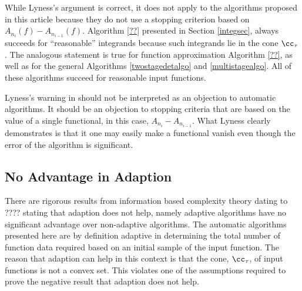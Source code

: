 \documentclass[]{elsarticle}
\theoremstyle{definition}
\theoremstyle{remark}
\begin{document}
While Lyness's argument is correct, it does not apply to the algorithms proposed in this article because they do not use a stopping criterion based on  $A_{n_{i}}(f)-A_{n_{i-1}}(f)$.  Algorithm \ref{??} presented in Section \ref{integsec}, always succeeds for ``reasonable'' integrands because such integrands lie in the cone $\cc_{\tau}$.  The analogous statement is true for function approximation Algorithm \ref{??}, as well as for the general Algorithms \ref{twostagedetalgo} and \ref{multistagealgo}.  All of these algorithms succeed for reasonable input functions.  

Lyness's warning in \cite{Lyn83} should not be interpreted as an objection to automatic algorithms.  It should be an objection to stopping criteria that are based on the value of a single functional, in this case, $A_{n_{i}}-A_{n_{i-1}}$.  What Lyness clearly demonstrates is that it one may easily make a functional vanish even though the error of the algorithm is significant.

\subsection{No Advantage in Adaption}

There are rigorous results from information based complexity theory dating to ???? stating that adaption does not help, namely adaptive algorithms have no significant advantage over non-adaptive algorithms. The automatic algorithms presented here are by definition adaptive in determining the total number of function data required based on an initial sample of the input function.  The reason that adaption can help in this context is that the cone, $\cc_{\tau}$, of input functions is not a convex set.  This violates one of the assumptions required to prove the negative result that adaption does not help.
\end{document}
